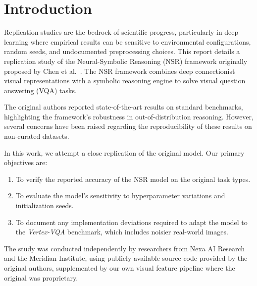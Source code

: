\section{Introduction}
Replication studies are the bedrock of scientific progress, particularly in deep learning where empirical results can be sensitive to environmental configurations, random seeds, and undocumented preprocessing choices. This report details a replication study of the Neural-Symbolic Reasoning (NSR) framework originally proposed by Chen et al.~\cite{chen2024neural}. The NSR framework combines deep connectionist visual representations with a symbolic reasoning engine to solve visual question answering (VQA) tasks.

The original authors reported state-of-the-art results on standard benchmarks, highlighting the framework's robustness in out-of-distribution reasoning. However, several concerns have been raised regarding the reproducibility of these results on non-curated datasets. 

In this work, we attempt a close replication of the original model. Our primary objectives are:
\begin{enumerate}
    \item To verify the reported accuracy of the NSR model on the original task types.
    \item To evaluate the model's sensitivity to hyperparameter variations and initialization seeds.
    \item To document any implementation deviations required to adapt the model to the \emph{Vertex-VQA} benchmark, which includes noisier real-world images.
\end{enumerate}

The study was conducted independently by researchers from Nexa AI Research and the Meridian Institute, using publicly available source code provided by the original authors, supplemented by our own visual feature pipeline where the original was proprietary.
